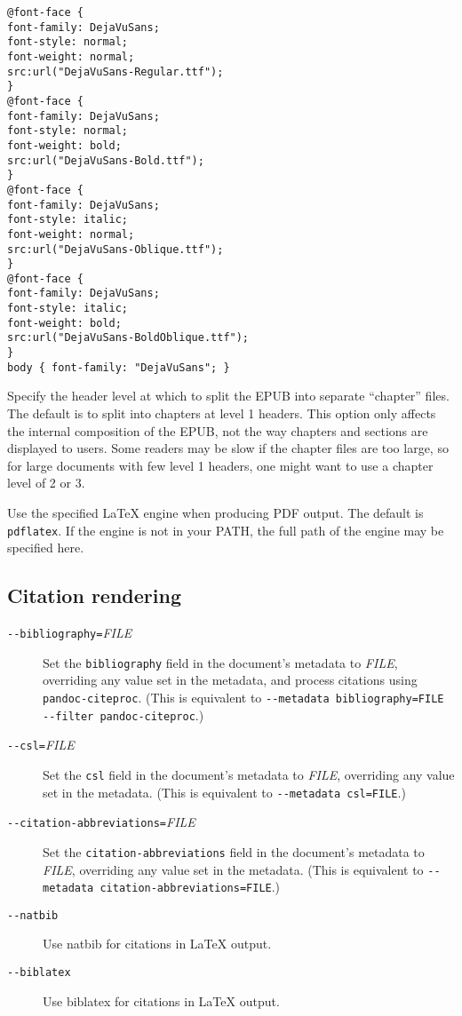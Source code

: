 \documentclass[]{article}
\begin{document}
\begin{description}
\begin{verbatim}
@font-face {
font-family: DejaVuSans;
font-style: normal;
font-weight: normal;
src:url("DejaVuSans-Regular.ttf");
}
@font-face {
font-family: DejaVuSans;
font-style: normal;
font-weight: bold;
src:url("DejaVuSans-Bold.ttf");
}
@font-face {
font-family: DejaVuSans;
font-style: italic;
font-weight: normal;
src:url("DejaVuSans-Oblique.ttf");
}
@font-face {
font-family: DejaVuSans;
font-style: italic;
font-weight: bold;
src:url("DejaVuSans-BoldOblique.ttf");
}
body { font-family: "DejaVuSans"; }
\end{verbatim}
\item[\texttt{-{}-epub-chapter-level=}\emph{NUMBER}]
Specify the header level at which to split the EPUB into separate
``chapter'' files. The default is to split into chapters at level 1
headers. This option only affects the internal composition of the EPUB,
not the way chapters and sections are displayed to users. Some readers
may be slow if the chapter files are too large, so for large documents
with few level 1 headers, one might want to use a chapter level of 2 or
3.
\item[\texttt{-{}-latex-engine=}\emph{pdflatex\textbar{}lualatex\textbar{}xelatex}]
Use the specified LaTeX engine when producing PDF output. The default is
\texttt{pdflatex}. If the engine is not in your PATH, the full path of
the engine may be specified here.
\end{description}

\subsection{Citation rendering}\label{citation-rendering}

\begin{description}
\item[\texttt{-{}-bibliography=}\emph{FILE}]
Set the \texttt{bibliography} field in the document's metadata to
\emph{FILE}, overriding any value set in the metadata, and process
citations using \texttt{pandoc-citeproc}. (This is equivalent to
\texttt{-{}-metadata bibliography=FILE -{}-filter pandoc-citeproc}.)
\item[\texttt{-{}-csl=}\emph{FILE}]
Set the \texttt{csl} field in the document's metadata to \emph{FILE},
overriding any value set in the metadata. (This is equivalent to
\texttt{-{}-metadata csl=FILE}.)
\item[\texttt{-{}-citation-abbreviations=}\emph{FILE}]
Set the \texttt{citation-abbreviations} field in the document's metadata
to \emph{FILE}, overriding any value set in the metadata. (This is
equivalent to \texttt{-{}-metadata citation-abbreviations=FILE}.)
\item[\texttt{-{}-natbib}]
Use natbib for citations in LaTeX output.
\item[\texttt{-{}-biblatex}]
Use biblatex for citations in LaTeX output.
\end{description}
\end{document}
